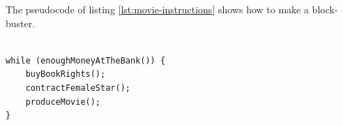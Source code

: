 \documentclass[11pt,twoside,a4paper,pagesize]{report}
\begin{document}

\restoregeometry




The pseudocode of listing \ref{lst:movie-instructions} shows how to
make a block-buster.

\lstset{language=Java}
\begin{lstlisting}[float, frame=single, caption=How to make a block-buster, label=lst:movie-instructions]

while (enoughMoneyAtTheBank()) {
    buyBookRights();
    contractFemaleStar();
    produceMovie();
}
\end{lstlisting}
\end{document}
